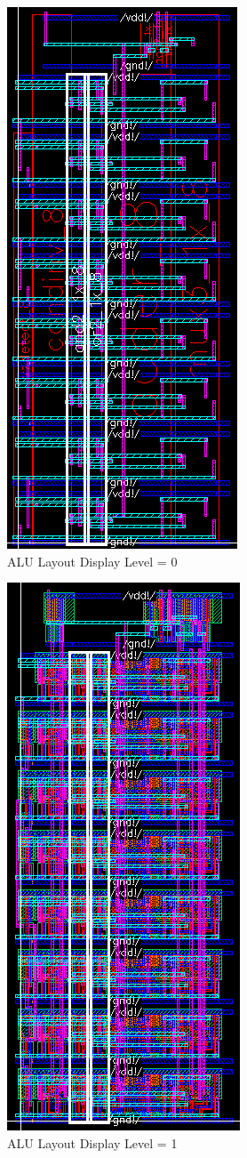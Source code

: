 \documentclass{article}
\begin{document}
	\begin{figure}[H]
		\centerline{\includegraphics[height=0.8\textwidth, angle=270]{alu_layout_overview.png}}
		\caption{ALU Layout Display Level = 0}
		\label{fig::alu_layout_overview}
	\end{figure}
	
	\begin{figure}[H]
		\centerline{\includegraphics[height=0.8\textwidth, angle=270]{alu_layout_detailed.png}}
		\caption{ALU Layout Display Level = 1}
		\label{fig::alu_layout_detailed}
	\end{figure}
	
\end{document}
